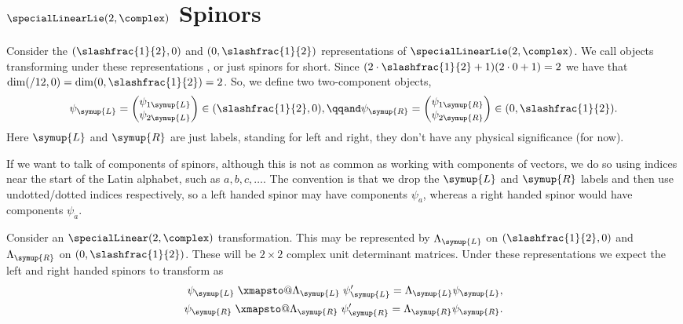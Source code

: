 \documentclass[fleqn]{NotesClass}
\makeatletter
\newcommand{\Left}{\symup{L}}
\newcommand{\Right}{\symup{R}}
\renewcommand{\xmapsto}[2][]{\mathrel{\mathpalette\xmapsto@{{#1}{#2}}}}
\newcommand{\xmapsto@}[2]{\xmapsto@@{#1}#2}
\newcommand{\xmapsto@@}[3]{%
    \begingroup
    \sbox\z@{$\m@th#1\mathop{}\limits_{\;#2\;}^{\;#3\;}$}%
    \mathop{\Uhextensible width \wd\z@ 0 "27FC}_{#2}^{#3}%
    \endgroup
}
\makeatother
\begin{document}
    \section{\texorpdfstring{\(\specialLinearLie(2, \complex)\)}{sl(2, C)} Spinors}
    Consider the \((\slashfrac{1}{2}, 0)\) and \((0, \slashfrac{1}{2})\) representations of \(\specialLinearLie(2, \complex)\).
    We call objects transforming under these representations , or just spinors for short.
    Since \((2 \cdot \slashfrac{1}{2} + 1)(2 \cdot 0 + 1) = 2\) we have that \(\dim(\slash{1}{2}, 0) = \dim(0, \slashfrac{1}{2}) = 2\).
    So, we define two two-component objects,
    \begin{equation}
        \psi_{\Left} = 
        \begin{pmatrix}
            \psi_{1\Left}\\ \psi_{2\Left}
        \end{pmatrix}
        \in (\slashfrac{1}{2}, 0)
        , \qqand \psi_{\Right} = 
        \begin{pmatrix}
            \psi_{1\Right}\\ \psi_{2\Right}
        \end{pmatrix}
        \in (0, \slashfrac{1}{2}).
    \end{equation}
    Here \(\Left\) and \(\Right\) are just labels, standing for left and right, they don't have any physical significance (for now).
    
    If we want to talk of components of spinors, although this is not as common as working with components of vectors, we do so using indices near the start of the Latin alphabet, such as \(a, b, c, \dotsc\).
    The convention is that we drop the \(\Left\) and \(\Right\) labels and then use undotted/dotted indices respectively, so a left handed spinor may have components \(\psi_a\), whereas a right handed spinor would have components \(\psi_{\dot{a}}\).
    
    Consider an \(\specialLinear(2, \complex)\) transformation.
    This may be represented by \(\Lambda_{\Left}\) on \((\slashfrac{1}{2}, 0)\) and \(\Lambda_{\Right}\) on \((0, \slashfrac{1}{2})\).
    These will be \(2 \times 2\) complex unit determinant matrices.
    Under these representations we expect the left and right handed spinors to transform as
    \begin{align}
        \psi_{\Left} \xmapsto{\Lambda_{\Left}} \psi'_{\Left} = \Lambda_{\Left} \psi_{\Left},\\
        \psi_{\Right} \xmapsto{\Lambda_{\Right}} \psi'_{\Right} = \Lambda_{\Right} \psi_{\Right}.
    \end{align}
    
\end{document}
